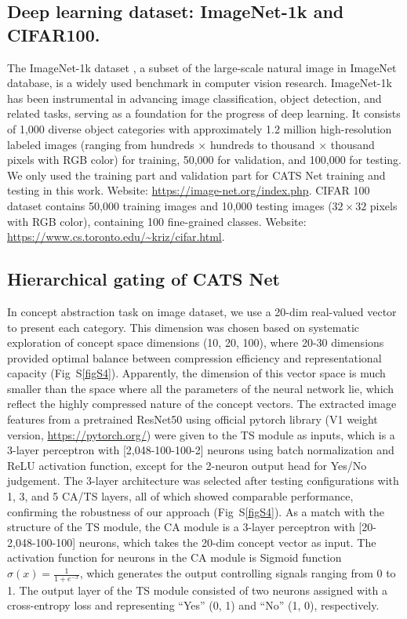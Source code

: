\documentclass[pdflatex,sn-mathphys-num,lineno]{sn-jnl}%
\begin{document}
\begin{CJK}{UTF8}{gbsn}
\subsection{Deep learning dataset: ImageNet-1k and CIFAR100.} The ImageNet-1k dataset \cite{deng_imagenet_2009}, a subset of the large-scale natural image in ImageNet database, is a widely used benchmark in computer vision research. ImageNet-1k has been instrumental in advancing image classification, object detection, and related tasks, serving as a foundation for the progress of deep learning. It consists of 1,000 diverse object categories with approximately 1.2 million high-resolution labeled images (ranging from hundreds $\times$ hundreds to thousand $\times$ thousand pixels with RGB color) for training, 50,000 for validation, and 100,000 for testing. We only used the training part and validation part for CATS Net training and testing in this work. Website: \url{https://image-net.org/index.php}. CIFAR 100 dataset \cite{krizhevsky_learning_2009} contains 50,000 training images and 10,000 testing images ($32\times32$ pixels with RGB color), containing 100 fine-grained classes. Website: \url{https://www.cs.toronto.edu/~kriz/cifar.html}.

\subsection{Hierarchical gating of CATS Net}
In concept abstraction task on image dataset, we use a 20-dim real-valued vector to present each category. This dimension was chosen based on systematic exploration of concept space dimensions (10, 20, 100), where 20-30 dimensions provided optimal balance between compression efficiency and representational capacity (Fig~S\ref{figS4}). Apparently, the dimension of this vector space is much smaller than the space where all the parameters of the neural network lie, which reflect the highly compressed nature of the concept vectors. The extracted image features from a pretrained ResNet50 \cite{he_deep_2016} using official pytorch library (V1 weight version, \url{https://pytorch.org/}) were given to the TS module as inputs, which is a 3-layer perceptron with [2,048-100-100-2] neurons using batch normalization and ReLU activation function, except for the 2-neuron output head for Yes/No judgement. The 3-layer architecture was selected after testing configurations with 1, 3, and 5 CA/TS layers, all of which showed comparable performance, confirming the robustness of our approach (Fig~S\ref{figS4}). As a match with the structure of the TS module, the CA module is a 3-layer perceptron with [20-2,048-100-100] neurons, which takes the 20-dim concept vector as input. The activation function for neurons in the CA module is Sigmoid function $\sigma(x) = \frac{1}{1 + e^{-x}}$, which generates the output controlling signals ranging from 0 to 1. The output layer of the TS module consisted of two neurons assigned with a cross-entropy loss and representing “Yes” (0, 1) and “No” (1, 0), respectively.


\end{CJK}
\end{document}
